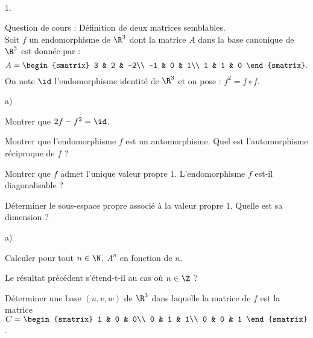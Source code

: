 \documentclass[11pt]{article}%
\begin{document}
\newpage


\begin{exerciceAP}~
  \begin{noliste}{1.}
    \setlength{\itemsep}{2mm}
  \item Question de cours : Définition de deux matrices semblables.\\
    Soit $f$ un endomorphisme de $\R^3$ dont la matrice $A$ dans la
    base canonique de $\R^3$ est donnée par :
    \[
    A = 
    \begin{smatrix} 
      3 & 2 & -2\\ 
      -1 & 0 & 1\\ 
      1 & 1 & 0
    \end{smatrix}.
    \]
    On note $\id$ l'endomorphisme identité de $\R^3$ et on pose :
    $f^2=f\circ f$.
  \item
    \begin{noliste}{a)}
    \setlength{\itemsep}{2mm}
    \item Montrer que $2f-f^2=\id$.
    \item Montrer que l'endomorphisme $f$ est un automorphisme. Quel
      est l'automorphisme réciproque de $f$ ?
    \item Montrer que $f$ admet l'unique valeur propre
      $1$. L'endomorphisme $f$ est-il diagonalisable ?
    \item Déterminer le sous-espace propre associé à la valeur propre
      $1$. Quelle est sa dimension ?
    \end{noliste}

  \item
    \begin{noliste}{a)}
    \setlength{\itemsep}{2mm}
    \item Calculer pour tout $n\in\N$, $A^n$ en fonction de $n$.
    \item Le résultat précédent s'étend-t-il au cas où $n\in\Z$ ?
    \end{noliste}

  \item Déterminer une base $(u,v,w)$ de $\R^3$ dans laquelle la
    matrice de $f$ est la matrice $C = 
    \begin{smatrix} 
      1 & 0 & 0\\
      0 & 1 & 1\\ 
      0 & 0 & 1
    \end{smatrix}$.
  \end{noliste}
\end{exerciceAP}
\end{document}
